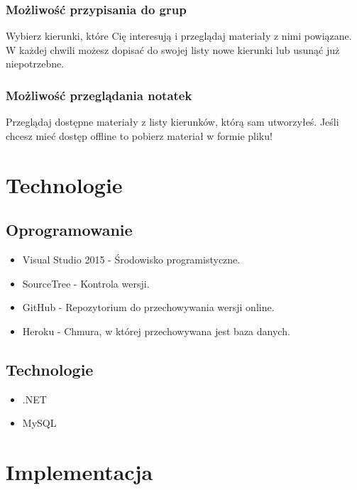 \documentclass[12pt,a4paper]{article}
\begin{document}
			\subsubsection{Możliwość przypisania do grup}
				Wybierz kierunki, które Cię interesują i przeglądaj materiały z nimi powiązane. W każdej chwili możesz dopisać do swojej listy nowe kierunki lub usunąć już niepotrzebne.
			\subsubsection{Możliwość przeglądania notatek}
				Przeglądaj dostępne materiały z listy kierunków, którą sam utworzyłeś. Jeśli chcesz mieć dostęp offline to pobierz materiał w formie pliku!
	\section{Technologie}
			\subsection{Oprogramowanie}
			\begin{itemize}
			\item Visual Studio 2015 - Środowisko programistyczne.
			\item SourceTree - Kontrola wersji.
			\item GitHub - Repozytorium do przechowywania wersji online.
			\item Heroku - Chmura, w której przechowywana jest baza danych.
			\end{itemize}
			\subsection{Technologie}
			\begin{itemize}
			\item .NET
			\item MySQL
			\end{itemize}
			\clearpage
	\section{Implementacja}
\end{document}
